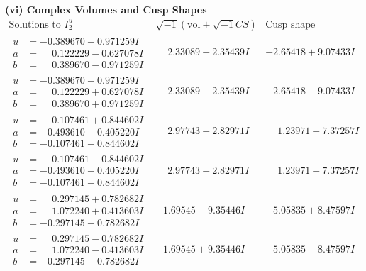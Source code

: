 \documentclass[1p]{elsarticle_modified}
\theoremstyle{definition}
\newcommand{\I}{\sqrt{-1}}
\begin{document}
\newpage\flushleft \textbf{(vi) Complex Volumes and Cusp Shapes}
$$\begin{array}{c|c|c}  
\text{Solutions to }I^u_{2}& \I (\text{vol} + \sqrt{-1}CS) & \text{Cusp shape}\\
 \hline 
\begin{aligned}
u &= -0.389670 + 0.971259 I \\
a &= \phantom{-}0.122229 - 0.627078 I \\
b &= \phantom{-}0.389670 - 0.971259 I\end{aligned}
 & \phantom{-}2.33089 + 2.35439 I & -2.65418 + 9.07433 I \\ \hline\begin{aligned}
u &= -0.389670 - 0.971259 I \\
a &= \phantom{-}0.122229 + 0.627078 I \\
b &= \phantom{-}0.389670 + 0.971259 I\end{aligned}
 & \phantom{-}2.33089 - 2.35439 I & -2.65418 - 9.07433 I \\ \hline\begin{aligned}
u &= \phantom{-}0.107461 + 0.844602 I \\
a &= -0.493610 - 0.405220 I \\
b &= -0.107461 - 0.844602 I\end{aligned}
 & \phantom{-}2.97743 + 2.82971 I & \phantom{-}1.23971 - 7.37257 I \\ \hline\begin{aligned}
u &= \phantom{-}0.107461 - 0.844602 I \\
a &= -0.493610 + 0.405220 I \\
b &= -0.107461 + 0.844602 I\end{aligned}
 & \phantom{-}2.97743 - 2.82971 I & \phantom{-}1.23971 + 7.37257 I \\ \hline\begin{aligned}
u &= \phantom{-}0.297145 + 0.782682 I \\
a &= \phantom{-}1.072240 + 0.413603 I \\
b &= -0.297145 - 0.782682 I\end{aligned}
 & -1.69545 - 9.35446 I & -5.05835 + 8.47597 I \\ \hline\begin{aligned}
u &= \phantom{-}0.297145 - 0.782682 I \\
a &= \phantom{-}1.072240 - 0.413603 I \\
b &= -0.297145 + 0.782682 I\end{aligned}
 & -1.69545 + 9.35446 I & -5.05835 - 8.47597 I \\ \hline\begin{aligned}

\end{aligned}
\end{array}$$
\end{document}
